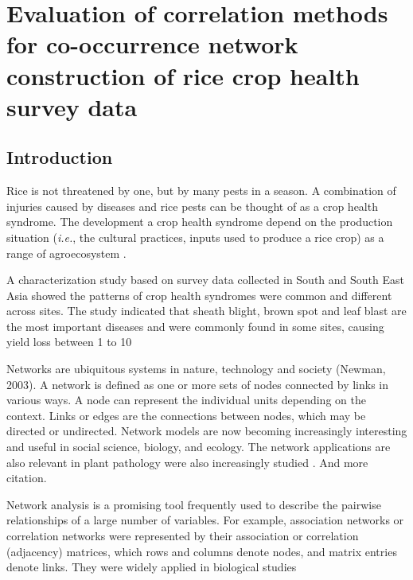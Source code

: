 \section{Evaluation of correlation methods for co-occurrence network construction of rice crop health survey data}

\subsection{Introduction}

Rice is not threatened by one, but by many pests in a season. A combination of injuries caused by diseases and rice pests can be thought of as a crop health syndrome. The development a crop health syndrome depend on the production situation (\textit{i.e.}, the cultural practices, inputs used to produce a rice crop) as a range of agroecosystem \citep{Savary_2006_Quantification}.

A characterization study based on survey data collected in South and South East Asia \citep{Savary_2000_Characterization} showed the patterns of crop health syndromes were common and different across sites. The study indicated that sheath blight, brown spot and leaf blast are the most important diseases and were commonly found in some sites, causing yield loss between 1 to 10%

Networks are ubiquitous systems in nature, technology and society (Newman, 2003). A network is defined as one or more sets of nodes connected by links in various ways. A node can represent the individual units depending on the context. Links or edges are the connections between nodes, which may be directed or undirected. Network models are now becoming increasingly interesting and useful in social science, biology, and ecology. The network applications  are also relevant in plant pathology were also increasingly studied \citep{Moslonka_Lefebvre_2011}. And more citation.

Network analysis is a promising tool frequently used to describe the pairwise relationships of a large number of variables. For example, association networks or correlation networks were represented by their association or correlation (adjacency) matrices, which rows and columns denote nodes, and matrix entries denote links. They were widely applied in biological studies \citep{Toubiana_2013_Net, Barabasi_2004_Network}


